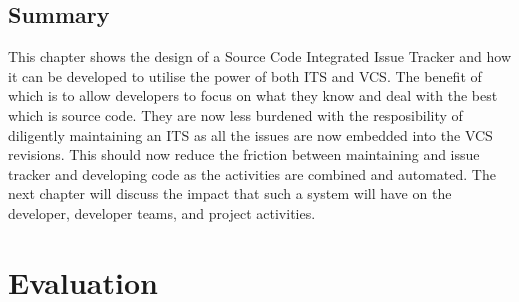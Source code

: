 \documentclass{mproj}
\begin{document}
\section{Summary}

This chapter shows the design of a Source Code Integrated Issue Tracker and how it can be developed to utilise the power of both ITS and VCS. The benefit of which is to allow developers to focus on what they know and deal with the best which is source code. They are now less burdened with the resposibility of diligently maintaining an ITS as all the issues are now embedded into the VCS revisions. This should now reduce the friction between maintaining and issue tracker and developing code as the activities are combined and automated. The next chapter will discuss the impact that such a system will have on the developer, developer teams, and project activities.

\chapter{Evaluation}\label{evaluation}






\end{document}
